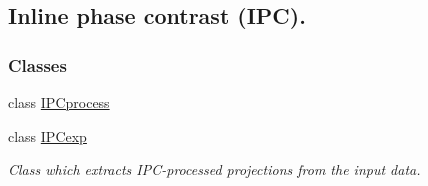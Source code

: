 \hypertarget{group__IPC}{
\subsection{Inline phase contrast (IPC).}
\label{group__IPC}
}
\subsubsection*{Classes}
\begin{DoxyCompactItemize}
\item 
class \hyperlink{classIPCprocess}{IPCprocess}
\item 
class \hyperlink{classIPCexp}{IPCexp}
\begin{DoxyCompactList}\small\item\em Class which extracts IPC-\/processed projections from the input data. \item\end{DoxyCompactList}\end{DoxyCompactItemize}
